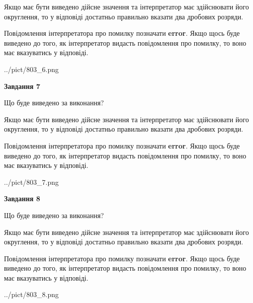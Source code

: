 \documentclass[12pt, ukrainian]{article}
\begin{document}
{\begin {Large}
Якщо має бути виведено дійсне значення та інтерпретатор має здійснювати його округлення, 
то у відповіді достатньо правильно вказати два дробових розряди.

Повідомлення інтерпретатора про помилку позначати \textbf{error}.
Якщо щось буде виведено до того, як інтерпретатор видасть повідомлення про помилку, 
то воно має вказуватись у відповіді. \par

\begin{center}
	{../pict/803_6.png}
\end{center}
\newpage

{\begin {center}\textbf{Завдання 7}\end {center}}\par
Що буде виведено за виконання? \par

Якщо має бути виведено дійсне значення та інтерпретатор має здійснювати його округлення, 
то у відповіді достатньо правильно вказати два дробових розряди.

Повідомлення інтерпретатора про помилку позначати \textbf{error}.
Якщо щось буде виведено до того, як інтерпретатор видасть повідомлення про помилку, 
то воно має вказуватись у відповіді. \par

\begin{center}
	{../pict/803_7.png}
\end{center}
\newpage

{\begin {center}\textbf{Завдання 8}\end {center}}\par
Що буде виведено за виконання? \par

Якщо має бути виведено дійсне значення та інтерпретатор має здійснювати його округлення, 
то у відповіді достатньо правильно вказати два дробових розряди.

Повідомлення інтерпретатора про помилку позначати \textbf{error}.
Якщо щось буде виведено до того, як інтерпретатор видасть повідомлення про помилку, 
то воно має вказуватись у відповіді. \par

\begin{center}
	{../pict/803_8.png}
\end{center}
\newpage


\end{Large}}
\end{document}
